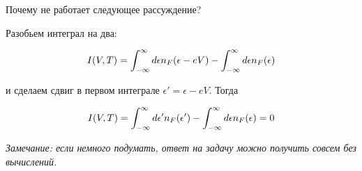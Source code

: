 \documentclass[a4paper,12pt]{article}
\begin{document}
\noindent Почему не работает следующее рассуждение?

\noindent Разобьем интеграл на два:

\begin{equation}
I(V,T)	=\int_{-\infty}^{\infty}d\epsilon n_{F}(\epsilon-eV)-\int_{-\infty}^{\infty}d\epsilon n_{F}(\epsilon)\notag
\end{equation}

\noindent и сделаем сдвиг в первом интеграле $\epsilon'=\epsilon-eV$. Тогда

\begin{equation} 
I(V,T)	=\int_{-\infty}^{\infty}d\epsilon'n_{F}(\epsilon')-\int_{-\infty}^{\infty}d\epsilon n_{F}(\epsilon)=0 \notag
\end{equation}

\noindent \textit{Замечание: если немного подумать, ответ на задачу можно получить совсем без вычислений.}
\end{document}
